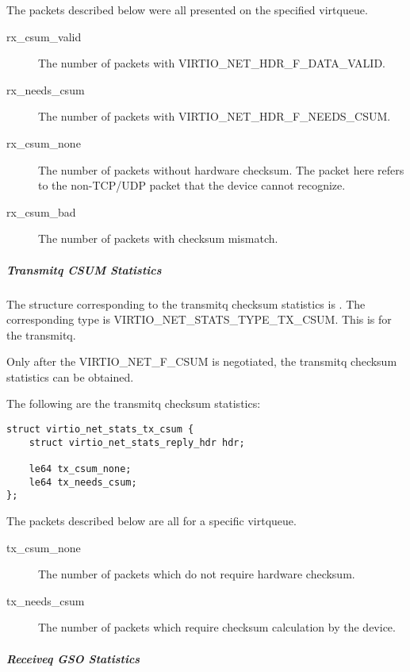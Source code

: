 The packets described below were all presented on the specified virtqueue.
\begin{description}
    \item [rx_csum_valid]
        The number of packets with VIRTIO_NET_HDR_F_DATA_VALID.

    \item [rx_needs_csum]
        The number of packets with VIRTIO_NET_HDR_F_NEEDS_CSUM.

    \item [rx_csum_none]
        The number of packets without hardware checksum. The packet here refers
        to the non-TCP/UDP packet that the device cannot recognize.

    \item [rx_csum_bad]
        The number of packets with checksum mismatch.

\end{description}

\subparagraph{Transmitq CSUM Statistics}\label{sec:Device Types / Network Device / Device Operation / Control Virtqueue / Device Statistics / Transmitq CSUM Statistics}

The structure corresponding to the transmitq checksum statistics is
. The corresponding type is
VIRTIO_NET_STATS_TYPE_TX_CSUM. This is for the transmitq.

Only after the VIRTIO_NET_F_CSUM is negotiated, the transmitq checksum
statistics can be obtained.

The following are the transmitq checksum statistics:

\begin{lstlisting}
struct virtio_net_stats_tx_csum {
    struct virtio_net_stats_reply_hdr hdr;

    le64 tx_csum_none;
    le64 tx_needs_csum;
};
\end{lstlisting}

The packets described below are all for a specific virtqueue.
\begin{description}
    \item [tx_csum_none]
        The number of packets which do not require hardware checksum.

    \item [tx_needs_csum]
        The number of packets which require checksum calculation by the device.

\end{description}

\subparagraph{Receiveq GSO Statistics}\label{sec:Device Types / Network Device / Device Operation / Control Virtqueue / Device Statistics / Receiveq GSO Statistics}

